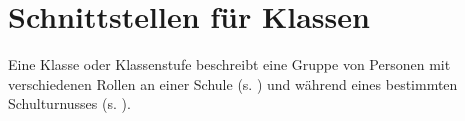 \section{Schnittstellen für Klassen}
Eine Klasse oder Klassenstufe beschreibt eine Gruppe von Personen mit verschiedenen Rollen an einer Schule (s. ) und während eines bestimmten Schulturnusses (s. ).


%


%


%
%
%
%
%
%



